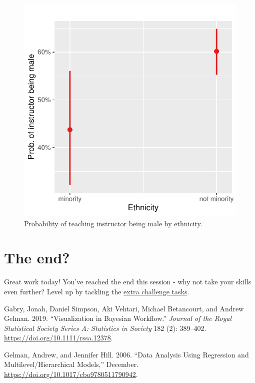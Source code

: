 \documentclass[
  letterpaper,
  DIV=11,
  numbers=noendperiod]{scrartcl}
\newlength{\cslhangindent}
\newenvironment{CSLReferences}[2] %
 {\begin{list}{}{%
  \setlength{\itemindent}{0pt}
  \setlength{\leftmargin}{0pt}
  \setlength{\parsep}{0pt}
  \ifodd #1
   \setlength{\leftmargin}{\cslhangindent}
   \setlength{\itemindent}{-1\cslhangindent}
  \fi
  \setlength{\itemsep}{#2\baselineskip}}}
 {\end{list}}
\begin{document}
\begin{figure}[H]

{\centering \includegraphics{index_files/figure-pdf/unnamed-chunk-54-1.pdf}

}

\caption{Probability of teaching instructor being male by ethnicity.}

\end{figure}%

\section*{The end?}\label{the-end}

Great work today! You've reached the end this session - why not take
your skills even further? Level up by tackling the
\href{about.qmd}{extra challenge tasks}.

\label{refs}
\begin{CSLReferences}{1}{0}
Gabry, Jonah, Daniel Simpson, Aki Vehtari, Michael Betancourt, and
Andrew Gelman. 2019. {``Visualization in Bayesian Workflow.''}
\emph{Journal of the Royal Statistical Society Series A: Statistics in
Society} 182 (2): 389--402. \url{https://doi.org/10.1111/rssa.12378}.

Gelman, Andrew, and Jennifer Hill. 2006. {``Data Analysis Using
Regression and Multilevel/Hierarchical Models,''} December.
\url{https://doi.org/10.1017/cbo9780511790942}.

\end{CSLReferences}
\end{document}

